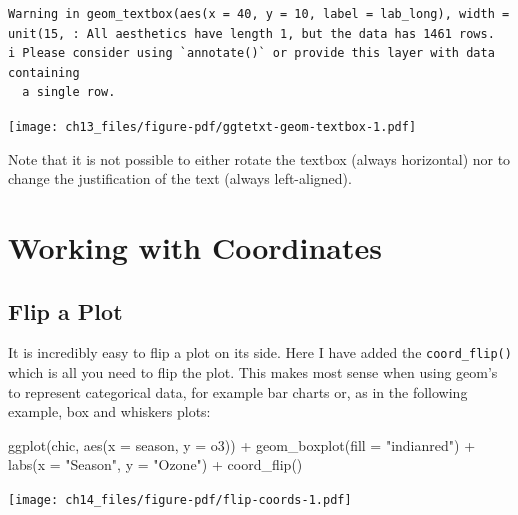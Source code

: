 \documentclass[
  letterpaper,
]{scrbook}
\newenvironment{Shaded}{\begin{snugshade}}{\end{snugshade}}
\newcommand{\AttributeTok}[1]{\textcolor[rgb]{0.40,0.45,0.13}{#1}}
\newcommand{\FunctionTok}[1]{\textcolor[rgb]{0.28,0.35,0.67}{#1}}
\newcommand{\NormalTok}[1]{\textcolor[rgb]{0.00,0.23,0.31}{#1}}
\newcommand{\SpecialCharTok}[1]{\textcolor[rgb]{0.37,0.37,0.37}{#1}}
\newcommand{\StringTok}[1]{\textcolor[rgb]{0.13,0.47,0.30}{#1}}
\begin{document}
\begin{verbatim}
Warning in geom_textbox(aes(x = 40, y = 10, label = lab_long), width = unit(15, : All aesthetics have length 1, but the data has 1461 rows.
i Please consider using `annotate()` or provide this layer with data containing
  a single row.
\end{verbatim}

\texttt{[image: ch13\_files/figure-pdf/ggtetxt-geom-textbox-1.pdf]}

Note that it is not possible to either rotate the textbox (always
horizontal) nor to change the justification of the text (always
left-aligned).


\chapter{Working with Coordinates}\label{coords}

\section{Flip a Plot}\label{flip-a-plot}

It is incredibly easy to flip a plot on its side. Here I have added the
\texttt{coord\_flip()} which is all you need to flip the plot. This
makes most sense when using geom's to represent categorical data, for
example bar charts or, as in the following example, box and whiskers
plots:

\begin{Shaded}
\begin{Highlighting}[]
\FunctionTok{ggplot}\NormalTok{(chic, }\FunctionTok{aes}\NormalTok{(}\AttributeTok{x =}\NormalTok{ season, }\AttributeTok{y =}\NormalTok{ o3)) }\SpecialCharTok{+}
  \FunctionTok{geom\_boxplot}\NormalTok{(}\AttributeTok{fill =} \StringTok{"indianred"}\NormalTok{) }\SpecialCharTok{+}
  \FunctionTok{labs}\NormalTok{(}\AttributeTok{x =} \StringTok{"Season"}\NormalTok{, }\AttributeTok{y =} \StringTok{"Ozone"}\NormalTok{) }\SpecialCharTok{+}
  \FunctionTok{coord\_flip}\NormalTok{()}
\end{Highlighting}
\end{Shaded}

\texttt{[image: ch14\_files/figure-pdf/flip-coords-1.pdf]}
\end{document}
